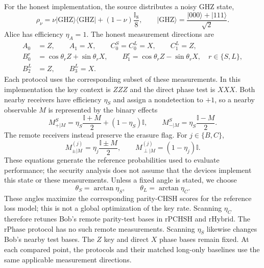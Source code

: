 \documentclass[aps,10pt,onecolumn,prx,superscriptaddress,longbibliography,nofootinbib]{revtex4-2}
\newcommand{\ket}[1]{\lvert #1\rangle}
\newcommand{\bra}[1]{\langle #1\rvert}
\newcommand{\id}{\mathbb I}
\newcommand{\perpout}{\perp}
\newcommand{\rPCHSH}{\mathrm{rPCHSH}}
\newcommand{\rPhase}{\mathrm{rPhase}}
\newcommand{\rHybrid}{\mathrm{rHybrid}}
\begin{document}
For the honest implementation, the source distributes a noisy GHZ state,
\begin{equation}
 \rho_\nu=\nu\ket{\mathrm{GHZ}}\!\bra{\mathrm{GHZ}}
 +(1-\nu)\frac{\id_8}{8},
 \qquad
 \ket{\mathrm{GHZ}}=\frac{\ket{000}+\ket{111}}{\sqrt2}.
 \label{eq:target-state}
\end{equation}
Alice has efficiency $\eta_A=1$. The honest measurement directions are
\begin{equation}
 \begin{aligned}
 A_0&=Z,\qquad A_1=X,\qquad C_0^S=C_0^L=X,\qquad C_1^L=Z,\\
 B_0^r&=\cos\theta_r Z+\sin\theta_r X,\qquad
 B_1^r=\cos\theta_r Z-\sin\theta_r X,\quad r\in\{S,L\},\\
 B_2^L&=Z,\qquad B_3^L=X.
 \end{aligned}
 \label{eq:near-settings}
\end{equation}
Each protocol uses the corresponding subset of these measurements. In this implementation the key context is $ZZZ$ and the direct phase test is $XXX$. Both nearby receivers have efficiency $\eta_S$ and assign a nondetection to $+1$, so a nearby observable $M$ is represented by the binary effects
\begin{equation}
 M^S_{+|M}=\eta_S\frac{\id+M}{2}+(1-\eta_S)\id,
 \qquad
 M^S_{-|M}=\eta_S\frac{\id-M}{2}.
 \label{eq:near-povm}
\end{equation}
The remote receivers instead preserve the erasure flag. For \(j\in\{B,C\}\),
\begin{equation}
 M^{(j)}_{\pm|M}=\eta_j\frac{\id\pm M}{2},
 \qquad
 M^{(j)}_{\perpout|M}=(1-\eta_j)\id.
 \label{eq:remote-povm}
\end{equation}
These equations generate the reference probabilities used to evaluate performance; the security analysis does not assume that the devices implement this state or these measurements. Unless a fixed angle is stated, we choose
\begin{equation}
 \theta_S=\arctan\eta_S,\qquad \theta_L=\arctan\eta_C.
 \label{eq:angle-policy}
\end{equation}
These angles maximize the corresponding parity-CHSH scores for the reference loss model; this is not a global optimization of the key rate. Scanning \(\eta_C\) therefore retunes Bob's remote parity-test bases in \(\rPCHSH\) and \(\rHybrid\). The \(\rPhase\) protocol has no such remote measurements. Scanning \(\eta_S\) likewise changes Bob's nearby test bases. The \(Z\) key and direct \(X\) phase bases remain fixed. At each compared point, the protocols and their matched long-only baselines use the same applicable measurement directions.
\end{document}
